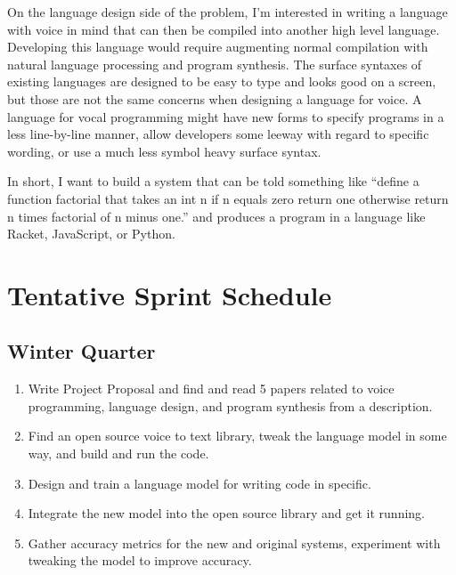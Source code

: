 \documentclass{article}
\begin{document}
On the language design side of the problem, I'm interested in writing a language with voice in mind that can then be compiled into another high level language. Developing this language would require augmenting normal compilation with natural language processing and program synthesis. The surface syntaxes of existing languages are designed to be easy to type and looks good on a screen, but those are not the same concerns when designing a language for voice. A language for vocal programming might have new forms to specify programs in a less line-by-line manner, allow developers some leeway with regard to specific wording, or use a much less symbol heavy surface syntax.

In short, I want to build a system that can be told something like ``define a function factorial that takes an int n if n equals zero return one otherwise return n times factorial of n minus one.'' and produces a program in a language like Racket, JavaScript, or Python.

\section{Tentative Sprint Schedule}



\subsection{Winter Quarter}
\begin{enumerate}
    \item Write Project Proposal and find and read 5 papers related to voice programming, language design, and program synthesis from a description.
    \item Find an open source voice to text library, tweak the language model in some way, and build and run the code.
    \item Design and train a language model for writing code in specific.
    \item Integrate the new model into the open source library and get it running.
    \item Gather accuracy metrics for the new and original systems, experiment with tweaking the model to improve accuracy.
\end{enumerate}
\end{document}
